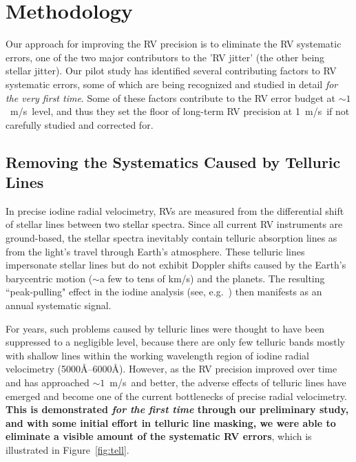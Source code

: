 \documentclass[12pt]{article}
\def\mps{m/s}
\begin{document}
\vspace{-3pt}
\section{Methodology}

Our approach for improving the RV precision is to eliminate the RV
systematic errors, one of the two major contributors to the 'RV
jitter' (the other being stellar jitter). Our pilot study has
identified several contributing factors to RV systematic errors, some
of which are being recognized and studied in detail \textit{for the
  very first time}. Some of these factors contribute to the RV error
budget at $\sim 1$~\mps\ level, and thus they set the floor of
long-term RV precision at 1~\mps\ if not carefully studied and
corrected for.

\vspace{-3pt}
\subsection{Removing the Systematics Caused by Telluric
  Lines}\label{sec:tell}

In precise iodine radial velocimetry, RVs are measured from the
differential shift of stellar lines between two stellar spectra.
Since all current RV instruments are ground-based, the stellar spectra
inevitably contain telluric absorption lines as from the light's
travel through Earth's atmosphere. These telluric lines impersonate
stellar lines but do not exhibit Doppler shifts caused by the Earth's
barycentric motion ($\sim$a few to tens of k\mps) and the planets. The
resulting ``peak-pulling" effect in the iodine analysis (see,
e.g.~\citealt{wright2013}) then manifests as an annual systematic
signal.

For years, such problems caused by telluric lines were thought to have
been suppressed to a negligible level, because there are only few
telluric bands mostly with shallow lines within the working wavelength
region of iodine radial velocimetry (5000\AA--6000\AA). However, as
the RV precision improved over time and has approached
$\sim1$~\mps\ and better, the adverse effects of telluric lines have
emerged and become one of the current bottlenecks of precise radial
velocimetry. \textbf{This is demonstrated \textit{for the first time}
  through our preliminary study, and with some initial effort in
  telluric line masking, we were able to eliminate a visible amount of
  the systematic RV errors}, which is illustrated in
Figure~\ref{fig:tell}.
\end{document}
